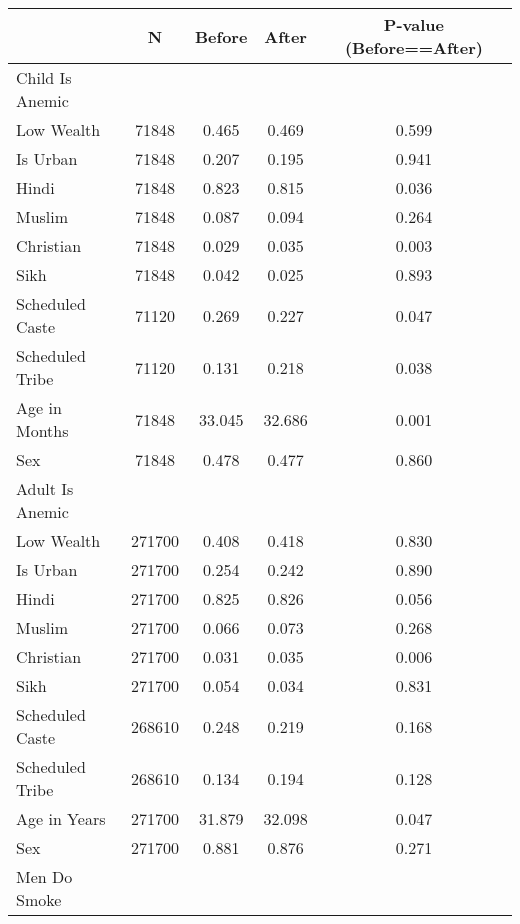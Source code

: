 \begin{tabular}{l*{4}{c}}
\hline\hline
            &           N&      Before&       After&P-value (Before==After)\\
\hline
Child Is Anemic&            &            &            &            \\
Low Wealth  &       71848&       0.465&       0.469&       0.599\\
Is Urban    &       71848&       0.207&       0.195&       0.941\\
Hindi       &       71848&       0.823&       0.815&       0.036\\
Muslim      &       71848&       0.087&       0.094&       0.264\\
Christian   &       71848&       0.029&       0.035&       0.003\\
Sikh        &       71848&       0.042&       0.025&       0.893\\
Scheduled Caste&       71120&       0.269&       0.227&       0.047\\
Scheduled Tribe&       71120&       0.131&       0.218&       0.038\\
Age in Months&       71848&      33.045&      32.686&       0.001\\
Sex         &       71848&       0.478&       0.477&       0.860\\
\hline
Adult Is Anemic&            &            &            &            \\
Low Wealth  &      271700&       0.408&       0.418&       0.830\\
Is Urban    &      271700&       0.254&       0.242&       0.890\\
Hindi       &      271700&       0.825&       0.826&       0.056\\
Muslim      &      271700&       0.066&       0.073&       0.268\\
Christian   &      271700&       0.031&       0.035&       0.006\\
Sikh        &      271700&       0.054&       0.034&       0.831\\
Scheduled Caste&      268610&       0.248&       0.219&       0.168\\
Scheduled Tribe&      268610&       0.134&       0.194&       0.128\\
Age in Years&      271700&      31.879&      32.098&       0.047\\
Sex         &      271700&       0.881&       0.876&       0.271\\
\hline
Men Do Smoke&            &            &            &            \\

\end{tabular}
